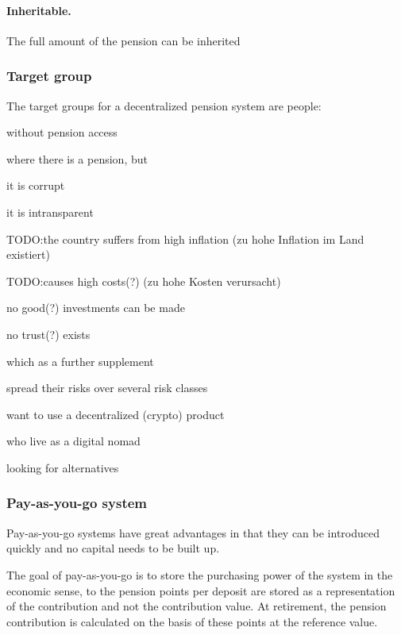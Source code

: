 \paragraph{Inheritable.} The full amount of the pension can be inherited


\subsubsection{Target group}
The target groups for a decentralized pension system are people:

\begin{compactitem}
\item without pension access
\item where there is a pension, but
 \begin{compactitem}
 \item it is corrupt
 \item it is intransparent
 \item TODO:the country suffers from high inflation (zu hohe Inflation im Land existiert)
 \item TODO:causes high costs(?) (zu hohe Kosten verursacht)
 \item no good(?) investments can be made
 \item no trust(?) exists
 \end{compactitem}
\item which as a further supplement 
 \begin{compactitem}
 \item spread their risks over several risk classes
 \item want to use a decentralized (crypto) product
 \item who live as a digital nomad
 \item looking for alternatives
 \end{compactitem}
\end{compactitem}

\subsubsection{Pay-as-you-go system}


Pay-as-you-go systems have great advantages in that they can be introduced quickly and no capital needs to be built up.

The goal of pay-as-you-go is to store the purchasing power of the system in the economic sense, to the pension points per deposit are stored as a representation of the contribution and not the contribution value.
At retirement, the pension contribution is calculated on the basis of these points at the reference value.

